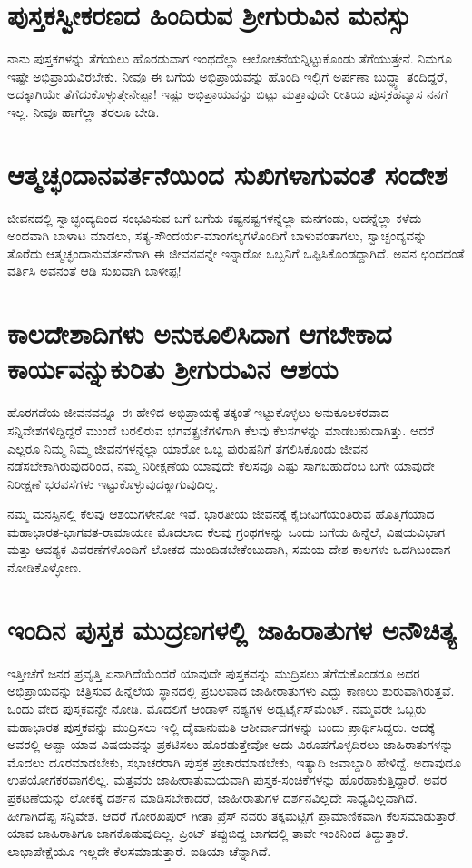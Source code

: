 \section*{ಪುಸ್ತಕಸ್ವೀಕರಣದ ಹಿಂದಿರುವ ಶ್ರೀಗುರುವಿನ ಮನಸ್ಸು}

ನಾನು ಪುಸ್ತಕಗಳನ್ನು ತೆಗೆಯಲು ಹೊರಡುವಾಗ ಇಂಥದೆಲ್ಲಾ ಆಲೋಚನೆಯನ್ನಿಟ್ಟುಕೊಂಡು ತೆಗೆಯುತ್ತೇನೆ. ನಿಮಗೂ ಇಷ್ಟೇ ಅಭಿಪ್ರಾಯವಿರಬೇಕು. ನೀವೂ ಈ ಬಗೆಯ ಅಭಿಪ್ರಾಯವನ್ನು ಹೊಂದಿ ಇಲ್ಲಿಗೆ  ಅರ್ಪಣಾ ಬುದ್ಧ್ಯಾ ತಂದಿದ್ದರೆ, ಅದಕ್ಕಾಗಿಯೇ ತೆಗೆದುಕೊಳ್ಳುತ್ತೇನೇಪ್ಪಾ! ಇಷ್ಟು ಅಭಿಪ್ರಾಯವನ್ನು ಬಿಟ್ಟು ಮತ್ತಾವುದೇ ರೀತಿಯ ಪುಸ್ತಕಹವ್ಯಾಸ ನನಗೆ ಇಲ್ಲ. ನೀವೂ ಹಾಗೆಲ್ಲಾ ತರಲೂ ಬೇಡಿ.

\section*{ಆತ್ಮಚ್ಛಂದಾನವರ್ತನೆಯಿಂದ ಸುಖಿಗಳಾಗುವಂತೆ ಸಂದೇಶ}

ಜೀವನದಲ್ಲಿ ಸ್ವಾಚ್ಛಂದ್ಯದಿಂದ ಸಂಭವಿಸುವ ಬಗೆ ಬಗೆಯ ಕಷ್ಟನಷ್ಟಗಳನ್ನೆಲ್ಲಾ ಮನಗಂಡು, ಅದನ್ನೆಲ್ಲಾ ಕಳೆದು ಅಂದವಾಗಿ ಬಾಳಾಟ ಮಾಡಲು, ಸತ್ಯ-ಸೌಂದರ್ಯ-ಮಾಂಗಲ್ಯಗಳೊಂದಿಗೆ ಬಾಳುವಂತಾಗಲು, ಸ್ವಾಚ್ಛಂದ್ಯವನ್ನು ತೊರೆದು ಆತ್ಮಚ್ಛಂದಾನುವರ್ತನೆಗಾಗಿ ಈ ಜೀವನವನ್ನೇ ಇನ್ನಾರೋ ಒಬ್ಬನಿಗೆ ಒಪ್ಪಿಸಿಕೊಂಡದ್ದಾಗಿದೆ. ಅವನ ಛಂದದಂತೆ ವರ್ತಿಸಿ ಅವನಂತೆ ಆಡಿ ಸುಖವಾಗಿ ಬಾಳೀಪ್ಪ!

\section*{ಕಾಲದೇಶಾದಿಗಳು ಅನುಕೂಲಿಸಿದಾಗ ಆಗಬೇಕಾದ ಕಾರ್ಯವನ್ನುಕುರಿತು ಶ್ರೀಗುರುವಿನ ಆಶಯ}

ಹೊರಗಡೆಯ ಜೀವನವನ್ನೂ ಈ ಹೇಳಿದ ಅಭಿಪ್ರಾಯಕ್ಕೆ ತಕ್ಕಂತೆ ಇಟ್ಟುಕೊಳ್ಳಲು ಅನುಕೂಲಕರವಾದ ಸನ್ನಿವೇಶಗಳಿದ್ದಿದ್ದರೆ ಮುಂದೆ ಬರಲಿರುವ ಭಗವತ್ಪ್ರಜೆಗಳಿಗಾಗಿ ಕೆಲವು ಕೆಲಸಗಳನ್ನು ಮಾಡಬಹುದಾಗಿತ್ತು. ಆದರೆ ಎಲ್ಲರೂ ನಿಮ್ಮ ನಿಮ್ಮ ಜೀವನಗಳನ್ನೆಲ್ಲಾ ಯಾರೋ ಒಬ್ಬ ಪುರುಷನಿಗೆ ತಗಲಿಸಿಕೊಂಡು ಜೀವನ ನಡೆಸಬೇಕಾಗಿರುವುದರಿಂದ, ನಮ್ಮ ನಿರೀಕ್ಷಣೆಯ ಯಾವುದೇ ಕೆಲಸವೂ ಎಷ್ಟು ಸಾಗಬಹುದೆಂಬ ಬಗೇ ಯಾವುದೇ ನಿರೀಕ್ಷಣೆ ಭರವಸೆಗಳು ಇಟ್ಟುಕೊಳ್ಳುವುದಕ್ಕಾಗುವುದಿಲ್ಲ.

ನಮ್ಮ ಮನಸ್ಸಿನಲ್ಲಿ ಕೆಲವು ಆಶಯಗಳೇನೋ ಇವೆ. ಭಾರತೀಯ ಜೀವನಕ್ಕೆ ಕೈದೀವಿಗೆಯಂತಿರುವ ಹೊತ್ತಿಗೆಯಾದ ಮಹಾಭಾರತ-ಭಾಗವತ-ರಾಮಾಯಣ ಮೊದಲಾದ ಕೆಲವು ಗ್ರಂಥಗಳನ್ನು ಒಂದು ಬಗೆಯ ಹಿನ್ನೆಲೆ, ವಿಷಯವಿಭಾಗ ಮತ್ತು ಆವಶ್ಯಕ ವಿವರಣೆಗಳೊಂದಿಗೆ ಲೋಕದ ಮುಂದಿಡಬೇಕೆಂಬುದಾಗಿ, ಸಮಯ ದೇಶ ಕಾಲಗಳು ಒದಗಿಬಂದಾಗ ನೋಡಿಕೊಳ್ಳೋಣ.

\section*{ಇಂದಿನ ಪುಸ್ತಕ ಮುದ್ರಣಗಳಲ್ಲಿ ಜಾಹಿರಾತುಗಳ ಅನೌಚಿತ್ಯ}

ಇತ್ತೀಚೆಗೆ ಜನರ ಪ್ರವೃತ್ತಿ ಏನಾಗಿದೆಯೆಂದರೆ ಯಾವುದೇ ಪುಸ್ತಕವನ್ನು ಮುದ್ರಿಸಲು ತೆಗೆದುಕೊಂಡರೂ ಅದರ ಅಭಿಪ್ರಾಯವನ್ನು ಚಿತ್ರಿಸುವ ಹಿನ್ನೆಲೆಯ ಸ್ಥಾನದಲ್ಲಿ ಪ್ರಬಲವಾದ ಜಾಹೀರಾತುಗಳು ಎದ್ದು ಕಾಣಲು ಶುರುವಾಗಿರುತ್ತವೆ. ಒಂದು ವೇದ ಪುಸ್ತಕವನ್ನೇ ನೋಡಿ. ಮೊದಲಿಗೆ ಆಂಡಾಳ್ ನಶ್ಯಗಳ ಅಡ್ವರ್ಟೈಸ್‌ಮೆಂಟ್. ನಮ್ಮವರೇ ಒಬ್ಬರು ಮಹಾಭಾರತ ಪುಸ್ತಕವನ್ನು ಮುದ್ರಿಸಲು ಇಲ್ಲಿ ದೈವಾನುಮತಿ ಆಶೀರ್ವಾದಗಳನ್ನು ಬಂದು ಪ್ರಾರ್ಥಿಸಿದ್ದರು. ಅದಕ್ಕೆ ಅವರಲ್ಲಿ ಅಪ್ಪಾ ಯಾವ ವಿಷಯವನ್ನು ಪ್ರಕಟಿಸಲು ಹೊರಡುತ್ತೇವೋ ಅದು ವಿರೂಪಗೊಳ್ಳದಿರಲು ಜಾಹಿರಾತುಗಳನ್ನು ಮೊದಲು ದೂರಮಾಡಬೇಕು, ಸಭಾಚರರಾಗಿ ಪುಸ್ತಕ ಪ್ರಚಾರಮಾಡಬೇಕು, ಇತ್ಯಾದಿ ಜವಾಬ್ದಾರಿ ಹೇಳಿದ್ದೆ. ಅದಾವುದೂ ಉಪಯೋಗಕರವಾಗಲಿಲ್ಲ. ಮತ್ತವರು ಜಾಹೀರಾತುಮಯವಾಗಿ ಪುಸ್ತಕ-ಸಂಚಿಕೆಗಳನ್ನು ಹೊರಹಾಕುತ್ತಿದ್ದಾರೆ. ಅವರ ಪ್ರಕಟಣೆಯನ್ನು ಲೋಕಕ್ಕೆ ದರ್ಶನ ಮಾಡಿಸಬೇಕಾದರೆ, ಜಾಹೀರಾತುಗಳ ದರ್ಶನವಿಲ್ಲದೇ ಸಾಧ್ಯವಿಲ್ಲವಾಗಿದೆ. ಹೀಗಾಗಿದೆಪ್ಪ ಸನ್ನಿವೇಶ. ಆದರೆ ಗೋರಖಪುರ್ ಗೀತಾ ಪ್ರೆಸ್ ನವರು ತಕ್ಕಮಟ್ಟಿಗೆ ಪ್ರಾಮಾಣಿಕವಾಗಿ ಕೆಲಸಮಾಡುತ್ತಾರೆ. ಯಾವ ಜಾಹಿರಾತಿಗೂ ಜಾಗಕೊಡುವುದಿಲ್ಲ. ಪ್ರಿಂಟ್ ತಪ್ಪುಬಿದ್ದ ಜಾಗದಲ್ಲಿ ತಾವೇ ಇಂಕಿನಿಂದ ತಿದ್ದುತ್ತಾರೆ. ಲಾಭಾಪೇಕ್ಷೆಯೂ ಇಲ್ಲದೇ ಕೆಲಸಮಾಡುತ್ತಾರೆ. ಐಡಿಯಾ ಚೆನ್ನಾಗಿದೆ. 

